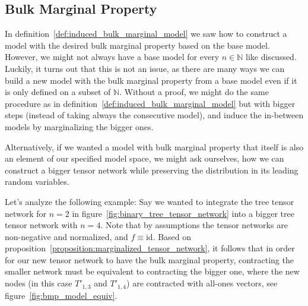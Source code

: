 \documentclass[../../main.tex]{subfiles}
\begin{document}
\subsection{Bulk Marginal Property}
    In definition~\ref{def:induced_bulk_marginal_model} we saw how to construct a model with the desired bulk marginal property based on the base model. However, we might not always have a base model for every $n \in \mathbb{N}$ like discussed. Luckily, it turns out that this is not an issue, as there are many ways we can build a new model with the bulk marginal property from a base model even if it is only defined on a subset of $\mathbb{N}$. Without a proof, we might do the same procedure as in definition~\ref{def:induced_bulk_marginal_model} but with bigger steps (instead of taking always the consecutive model), and induce the in-between models by marginalizing the bigger ones.

    Alternatively, if we wanted a model with bulk marginal property that itself is also an element of our specified model space, we might ask ourselves, how we can construct a bigger tensor network while preserving the distribution in its leading random variables.

    Let's analyze the following example: Say we wanted to integrate the tree tensor network for $n = 2$ in figure~\ref{fig:binary_tree_tensor_network} into a bigger tree tensor network with $n = 4$. Note that by assumptions the tensor networks are non-negative and normalized, and $f \equiv \text{id}$. Based on proposition~\ref{proposition:marginalized_tensor_network}, it follows that in order for our new tensor network to have the bulk marginal property, contracting the smaller network must be equivalent to contracting the bigger one, where the new nodes (in this case $T'_{1,3}$ and $T'_{1,4}$) are contracted with all-ones vectors, see figure~\ref{fig:bmp_model_equiv}.
\end{document}
